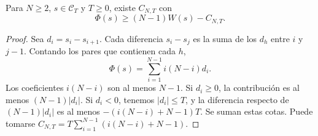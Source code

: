 \begin{lema}
\label{lem:ahr-phi}
Para $N\ge2$, $s\in\mathcal C_T$ y $T\ge0$, existe $C_{N,T}$ con
\begin{equation}
 \Phi(s)\ge (N-1)W(s)-C_{N,T}.
 \label{eq:ahr-phi}
\end{equation}
\end{lema}
\begin{proof}
Sea $d_i=s_i-s_{i+1}$. Cada diferencia $s_i-s_j$ es la suma de los $d_h$ entre $i$ y $j-1$. Contando los pares que contienen cada $h$,
\[
 \Phi(s)=\sum_{i=1}^{N-1}i(N-i)d_i.
\]
Los coeficientes $i(N-i)$ son al menos $N-1$. Si $d_i\ge0$, la contribución es al menos $(N-1)|d_i|$. Si $d_i<0$, tenemos $|d_i|\le T$, y la diferencia respecto de $(N-1)|d_i|$ es al menos $-(i(N-i)+N-1)T$. Se suman estas cotas. Puede tomarse $C_{N,T}=T\sum_{i=1}^{N-1}(i(N-i)+N-1)$.
\end{proof}

